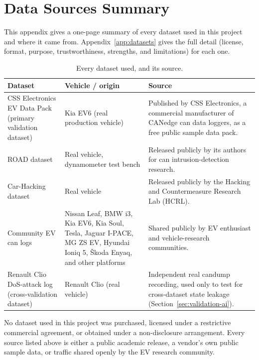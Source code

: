 \chapter{Data Sources Summary}
\label{app:data-sources}

This appendix gives a one-page summary of every dataset used in this project and where it came from. Appendix~\ref{app:datasets} gives the full detail (license, format, purpose, trustworthiness, strengths, and limitations) for each one.

\begin{table}[H]
\centering
\footnotesize
\caption{Every dataset used, and its source.}
\label{tab:data-sources-summary}
\begin{tabularx}{\textwidth}{|p{4.2cm}|p{4.0cm}|X|}
\hline
\textbf{Dataset} & \textbf{Vehicle / origin} & \textbf{Source} \\
\hline
CSS Electronics EV Data Pack (primary validation dataset) & Kia EV6 (real production vehicle) & Published by CSS Electronics, a commercial manufacturer of CANedge \gls{can} data loggers, as a free public sample data pack. \\
\hline
ROAD dataset~\cite{verma2020road} & Real vehicle, dynamometer test bench & Released publicly by its authors for \gls{can} intrusion-detection research. \\
\hline
Car-Hacking dataset~\cite{seo2018gids} & Real vehicle & Released publicly by the Hacking and Countermeasure Research Lab (HCRL). \\
\hline
Community EV \gls{can} logs & Nissan Leaf, BMW i3, Kia EV6, Kia Soul, Tesla, Jaguar I-PACE, MG ZS EV, Hyundai Ioniq 5, Škoda Enyaq, and other platforms & Shared publicly by EV enthusiast and vehicle-research communities. \\
\hline
Renault Clio DoS-attack log (cross-validation dataset) & Renault Clio (real vehicle) & Independent real candump recording, used only to test for cross-dataset state leakage (Section~\ref{sec:validation-ai}). \\
\hline
\end{tabularx}
\end{table}

No dataset used in this project was purchased, licensed under a restrictive commercial agreement, or obtained under a non-disclosure arrangement. Every source listed above is either a public academic release, a vendor's own public sample data, or traffic shared openly by the EV research community.
